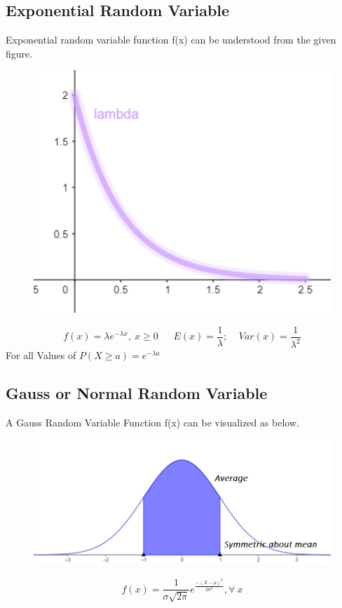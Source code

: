 \subsection{Exponential Random Variable}
Exponential random variable function f(x) can be understood from the given figure.
\begin{figure}[h!]
    \centering
    \includegraphics[scale=0.7]{images/exponential-random-variable.png}
\end{figure}
\[f(x)=\lambda e^{-\lambda x},\ x \geq 0\ \ \ \ \ \ \ E(x)=\frac{1}{\lambda};\ \ \ \ \ Var(x)=\frac{1}{\lambda^2}\]
For all Values of \(P(X\geq a)=e^{-\lambda a}\)


\subsection{Gauss or Normal Random Variable}
A Gauss Random Variable Function f(x) can be visualized as below.
\begin{figure}[h!]
    \centering
    \includegraphics[scale=0.5]{images/normal-random-variable.png}
\end{figure}
\[f(x)=\frac{1}{\sigma \sqrt{2\pi}}e^{\frac{-(X-\mu)^2}{2\sigma^2}},\forall\ x\]


